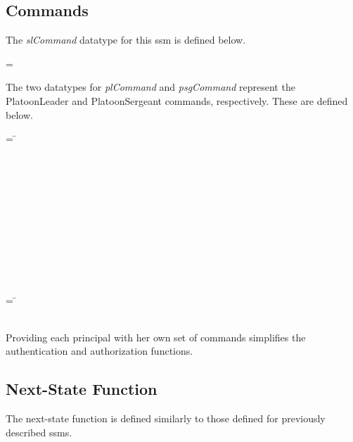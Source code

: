 \documentclass[../../main/main.tex]{subfiles}
\begin{document}
\subsection{Commands}
The \textit{slCommand} datatype for this \gls{ssm} is defined below.

 =   \HOLTokenBar{}  

The two datatypes for \textit{plCommand} and \textit{psgCommand} represent the PlatoonLeader and PlatoonSergeant commands, respectively. These are defined below.

\begin{tabbing}
\parskip=8pt
 = \= \\
					     \>\HOLTokenBar{}  \\
					     \>\HOLTokenBar{}  \\
					     \>\HOLTokenBar{} \\
          				     \>\HOLTokenBar{}  \\
				     	     \>\HOLTokenBar{}  \\
					     \>\HOLTokenBar{}  \\
					     \>\HOLTokenBar{}  \\
					     \>\HOLTokenBar{} \\
          				     \>\HOLTokenBar{}  \\
				     	     \>\HOLTokenBar{}  \\
					     \>\HOLTokenBar{} 
\parskip=18pt
\end{tabbing}

\begin{tabbing}
\parskip=8pt
 = \= \\
						\>\HOLTokenBar{} \\
           					\>\HOLTokenBar{} 
\parskip=18pt
\end{tabbing}

Providing each principal with her own set of commands simplifies the authentication and authorization functions.


\subsection{Next-State Function}
The next-state function is defined similarly to those defined for previously described \glspl{ssm}.  
\end{document}
